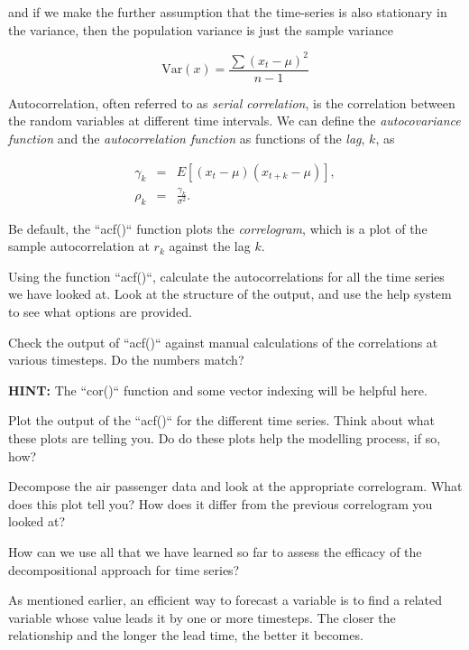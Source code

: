 \noindent
and if we make the further assumption that the time-series is also
stationary in the variance, then the population variance is just the
sample variance

\begin{equation}
\text{Var}(x) = \frac{\sum(x_t - \mu)^2}{n - 1}
\end{equation}

\noindent
Autocorrelation, often referred to as \emph{serial correlation}, is
the correlation between the random variables at different time
intervals. We can define the \emph{autocovariance function} and the
\emph{autocorrelation function} as functions of the \emph{lag}, $k$, as

\begin{eqnarray}
\gamma_k &=& E[(x_t - \mu)(x_{t+k} - \mu)], \\
\rho_k   &=& \frac{\gamma_k}{\sigma^2}.
\end{eqnarray}

\noindent
Be default, the ``acf()`` function plots the \emph{correlogram},
which is a plot of the sample autocorrelation at $r_k$ against the lag
$k$.


Using the function ``acf()``, calculate the autocorrelations for
all the time series we have looked at. Look at the structure of the
output, and use the help system to see what options are provided.


Check the output of ``acf()`` against manual calculations of the
correlations at various timesteps. Do the numbers match?

\noindent
\textbf{HINT:} The ``cor()`` function and some vector indexing
will be helpful here.


Plot the output of the ``acf()`` for the different time
series. Think about what these plots are telling you. Do do these
plots help the modelling process, if so, how?


Decompose the air passenger data and look at the appropriate
correlogram. What does this plot tell you? How does it differ from the
previous correlogram you looked at?


How can we use all that we have learned so far to assess the efficacy
of the decompositional approach for time series?





\noindent
As mentioned earlier, an efficient way to forecast a variable is to
find a related variable whose value leads it by one or more
timesteps. The closer the relationship and the longer the lead time,
the better it becomes.

